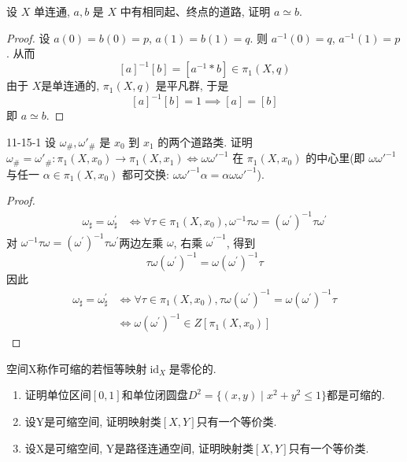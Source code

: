 \documentclass[../main.tex]{subfiles}
\begin{document}
\begin{exercise}{}{}
设 $X$ 单连通, $a,b$ 是 $X$ 中有相同起、终点的道路, 证明 $a\simeq b$.
\end{exercise}

\begin{proof}
    设 \(  a\left( 0 \right)= b\left( 0 \right)= p    \), \(  a\left( 1 \right)= b\left( 1 \right)= q    \). 则 \(  a^{-1} \left( 0 \right)= q   \), \(  a^{-1} \left( 1 \right) =  p   \). 从而 \[
   [a]^{-1} [b]=  [a^{-1} *b ] \in  \pi _{1}\left( X,q \right) 
    \]    由于 \(  X  \)是单连通的,  \(   \pi _1 \left( X,q \right)\)  是平凡群, 于是 \[
    [a]^{-1} [b]= 1\implies [a]= [b]
    \]即 \(  a\simeq b  \). 
\end{proof}

\begin{exercise}{}{11-15-1}
设 $\omega_{\#}, \omega'_{\#}$ 是 $x_{0}$ 到 $x_{1}$ 的两个道路类. 证明 $\omega_{\#}=\omega'_{\#}:\pi_{1}(X,x_{0})\rightarrow\pi_{1}(X,x_{1})\iff\omega\omega'^{-1}$ 在 $\pi_{1}(X,x_{0})$ 的中心里(即 $\omega\omega'^{-1}$ 与任一 $\alpha\in\pi_{1}(X,x_{0})$ 都可交换: $\omega\omega'^{-1}\alpha=\alpha\omega\omega'^{-1}$).
\end{exercise}
\begin{proof}
     \[
     \begin{aligned}
      \omega _{\sharp }=  \omega _{\sharp }^{\prime} &\iff  \forall \tau \in  \pi _1 \left( X,x_0 \right),   \omega ^{-1}  \tau  \omega =  \left(  \omega ^{\prime}  \right)^{-1} \tau    \omega ^{\prime} 
     \end{aligned}
     \]对 \(   \omega ^{-1}  \tau  \omega =  \left(  \omega ^{\prime}  \right)^{-1} \tau    \omega ^{\prime}    \)两边左乘 \(  \omega     \), 右乘 \(  { \omega ^{\prime} }^{-1}   \), 得到 \[
    \tau  \omega \left(  \omega ^{\prime}  \right)^{-1} =  \omega \left(  \omega ^{\prime}  \right)^{-1} \tau   
     \]   因此 \[
  \begin{aligned}
      \omega _{\sharp }=  \omega _{\sharp }^{\prime}& \iff \forall \tau \in  \pi _1 \left( X,x_0 \right),  \tau  \omega \left(  \omega ^{\prime}  \right)^{-1} =  \omega \left(  \omega ^{\prime}  \right)^{-1} \tau     \\ 
        &\iff  \omega \left(  \omega ^{\prime}  \right)^{-1} \in Z[ \pi _1 \left( X,x_0 \right) ] 
  \end{aligned}   
     \]
\end{proof}
\begin{exercise}{}{}
空间X称作可缩的若恒等映射$\operatorname{id}_X$是零伦的.
\begin{enumerate}
    \item 证明单位区间$[0,1]$和单位闭圆盘$D^2=\{(x,y) \mid x^2+y^2 \le 1\}$都是可缩的.
    \item 设Y是可缩空间, 证明映射类$[X, Y]$只有一个等价类.
    \item 设X是可缩空间, Y是路径连通空间, 证明映射类$[X, Y]$只有一个等价类.
\end{enumerate}
\end{exercise}
\end{document}
